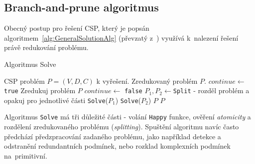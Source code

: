 \subsection{Branch-and-prune algoritmus}

Obecný postup pro řešení CSP, který je popsán algoritmem~\ref{alg:GeneralSolutionAlg} (převzatý z~\cite[s.~22]{Vu2005}) využívá k~nalezení řešení právě redukování problému.

\begin{algorithm}
\caption{Algoritmus Solve}
\label{alg:GeneralSolutionAlg}
\begin{algorithmic}[1]
\Require CSP problém $P = (V, D, C)$ k vyřešení.
\Ensure Zredukovaný problém $P$.
\State $continue \gets$ \verb|true|
\State Zredukuj problém $P$ \label{alg:generalSolutionAlg:Reduction}
\State $continue \gets $ \verb|false|
\Else
\State $P_1, P_2 \gets $\verb|Split| - rozděl problém a opakuj pro jednotlivé části
\State \verb|Solve|($P_1$)
\State \verb|Solve|($P_2$)
\EndIf
\Else
\State\Return $P$
\EndIf
\EndWhile
\State\Return $P$
\EndProcedure
\end{algorithmic}
\end{algorithm}

Algoritmus \verb|Solve| má tři důležité části - volání \verb|Happy| funkce, ověření \emph{atomicity} a rozdělení zredukovaného problému (\emph{splitting}). Spuštění algoritmu navíc často předchází předzpracování zadaného problému, jako například detekce a odstranění redundantních podmínek, nebo rozklad komplexních podmínek na~primitivní.

